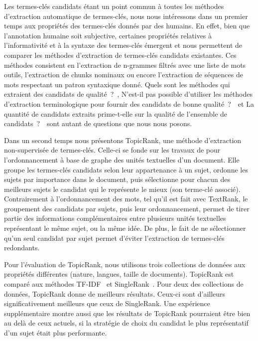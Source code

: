   Les termes-clés candidats étant un point commun à toutes les méthodes
  d'extraction automatique de termes-clés, nous nous intéressons dans un premier
  temps aux propriétés des termes-clés donnés par des humains. En effet, bien
  que l'annotation humaine soit subjective, certaines propriétés relatives à
  l'informativité et à la syntaxe des termes-clés émergent et nous permettent de
  comparer les méthodes d'extraction de termes-clés candidats existantes. Ces
  méthodes consistent en l'extraction de n-grammes filtrés avec une liste de
  mots outils, l'extraction de chunks nominaux ou encore l'extraction de
  séquences de mots respectant un patron syntaxique donné. \og Quels sont les
  méthodes qui extraient des candidats de qualité~?~\fg, \og N'est-il pas
  possible d'utiliser les méthodes d'extraction terminologique pour fournir des
  candidats de bonne qualité~?~\fg\ et \og La quantité de candidats extraits
  prime-t-elle sur la qualité de l'ensemble de candidats~?~\fg\ sont autant de
  questions que nous nous posons.

  Dans un second temps nous présentons TopicRank, une méthode d'extraction
  non-supervisée de termes-clés. Celle-ci se fonde sur les travaux de
   pour l'ordonnancement à base de
  graphe des unités textuelles d'un document. Elle groupe les termes-clés
  candidats selon leur appartenance à un sujet, ordonne les sujets par
  importance dans le document, puis sélectionne pour chacun des meilleurs sujets
  le candidat qui le représente le mieux (son terme-clé associé).
  Contrairement à l'ordonnancement des mots, tel qu'il est fait avec TextRank,
  le groupement des candidats par sujets, puis leur ordonnancement, permet de
  tirer partie des informations complémentaires entre plusieurs unités
  textuelles représentant le même sujet, ou la même idée. De plus, le fait de ne
  sélectionner qu'un seul candidat par sujet permet d'éviter l'extraction de
  termes-clés redondants.

  Pour l'évaluation de TopicRank, nous utilisons trois collections de données
  aux propriétés différentes (nature, langues, taille de documents). TopicRank
  est comparé aux méthodes TF-IDF~\cite{jones1972tfidf} et
  SingleRank~\cite{wan2008expandrank}. Pour deux des collections de données,
  TopicRank donne de meilleurs résultats. Ceux-ci sont d'ailleurs
  significativement meilleurs que ceux de SingleRank. Une expérience
  supplémentaire montre aussi que les résultats de TopicRank pourraient être
  bien au delà de ceux actuels, si la stratégie de choix du candidat le plus
  représentatif d'un sujet était plus performante.


